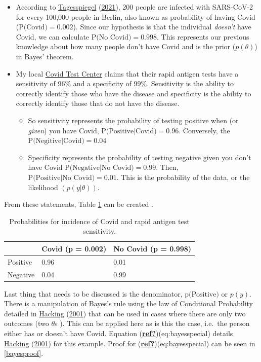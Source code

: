 \documentclass[12pt,twoside]{reedthesis}
\providecommand{\tightlist}{%
  \setlength{\itemsep}{0pt}\setlength{\parskip}{0pt}}
\begin{document}
\begin{itemize}
\item
  According to \protect\hyperlink{ref-tagesspiegelCoronavirusKarteDeutschlandweiteFallzahlen2021}{Tagesspiegel} (\protect\hyperlink{ref-tagesspiegelCoronavirusKarteDeutschlandweiteFallzahlen2021}{2021}), 200 people are infected with SARS-CoV-2 for every 100,000 people in Berlin, also known as probability of having Covid (\(\text{P(Covid)} = 0.002\)). Since our hypothesis is that the individual \emph{doesn't} have Covid, we can calculate \(\text{P(No Covid)} = 0.998\). This represents our previous knowledge about how many people don't have Covid and is the prior (\(p(\theta)\)) in Bayes' theorem.
\item
  My local \href{https://schnell.coronatest.de/?lang=en}{Covid Test Center} claims that their rapid antigen tests have a sensitivity of 96\% and a specificity of 99\%. Sensitivity is the ability to correctly identify those who have the disease and specificity is the ability to correctly identify those that do not have the disease.
  \begin{itemize}
  \tightlist
  \item
    So sensitivity represents the probability of testing positive when (or \emph{given}) you have Covid, \(\text{P(Positive|Covid)} = 0.96\). Conversely, the \(\text{P(Negitive|Covid)} = 0.04\)
  \item
    Specificity represents the probability of testing negative given you don't have Covid \(\text{P(Negative|No Covid)} = 0.99\). Then, \(\text{P(Positive|No Covid)} = 0.01\). This is the probability of the data, or the likelihood \((p(y|\theta))\).
  \end{itemize}
\end{itemize}
From these statements, Table \ref{tab:makingcovid} can be created .
\begin{table}[H]

\caption{\label{tab:makingcovid}\label{tab:makingcovid}Probabilities for incidence of Covid and rapid antigen test sensitivity.}
\centering
\begin{tabular}[t]{lll}
\toprule
  & Covid (p = 0.002) & No Covid (p = 0.998)\\
\midrule
Positive & 0.96 & 0.01\\
Negative & 0.04 & 0.99\\
\bottomrule
\end{tabular}
\end{table}
Last thing that needs to be discussed is the denominator, \(\text{p(Positive)}\) or \(p(y)\). There is a manipulation of Bayes's rule using the law of Conditional Probability detailed in \protect\hyperlink{ref-hackingIntroductionProbabilityInductive2001}{Hacking} (\protect\hyperlink{ref-hackingIntroductionProbabilityInductive2001}{2001}) that can be used in cases where there are only two outcomes (two \(\theta\)s ). This can be applied here as is this the case, i.e.~the person either has or doesn't have Covid. Equation (\protect\hyperlink{ref-ref}{\textbf{ref?}})(eq:bayesspecial) details \protect\hyperlink{ref-hackingIntroductionProbabilityInductive2001}{Hacking} (\protect\hyperlink{ref-hackingIntroductionProbabilityInductive2001}{2001}) for this example. Proof for (\protect\hyperlink{ref-ref}{\textbf{ref?}})(eq:bayesspecial) can be seen in \ref{bayesproof}.
\end{document}
